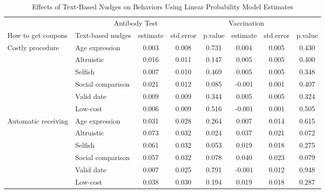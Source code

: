 \documentclass[
  11pt,
  a4paper,
]{article}
\begin{document}
\begin{table}

\caption{\label{tab:act-reg-ftest}Effects of Text-Based Nudges on Behaviors Using Linear Probability Model Estimates}
\centering
\begin{tabular}[t]{>{\raggedright\arraybackslash}p{5em}lcccccc}
\toprule
\multicolumn{2}{c}{ } & \multicolumn{3}{c}{Antibody Test} & \multicolumn{3}{c}{Vaccination} \\
\cmidrule(l{3pt}r{3pt}){3-5} \cmidrule(l{3pt}r{3pt}){6-8}
How to get coupons & Text-based nudges & estimate & std.error & p.value & estimate  & std.error  & p.value \\
\midrule
Costly procedure & Age expression & 0.003 & 0.008 & 0.731 & 0.004 & 0.005 & 0.430\\
 & Altruistic & 0.016 & 0.011 & 0.147 & 0.005 & 0.005 & 0.400\\
 & Selfish & 0.007 & 0.010 & 0.469 & 0.005 & 0.005 & 0.348\\
 & Social comparison & 0.021 & 0.012 & 0.085 & -0.001 & 0.001 & 0.407\\
 & Valid date & 0.009 & 0.009 & 0.344 & 0.005 & 0.005 & 0.324\\
 & Low-cost & 0.006 & 0.009 & 0.516 & -0.001 & 0.001 & 0.505\\
Automatic receiving & Age expression & 0.031 & 0.028 & 0.264 & 0.007 & 0.014 & 0.615\\
 & Altruistic & 0.073 & 0.032 & 0.024 & 0.037 & 0.021 & 0.072\\
 & Selfish & 0.061 & 0.032 & 0.053 & 0.019 & 0.018 & 0.275\\
 & Social comparison & 0.057 & 0.032 & 0.078 & 0.040 & 0.023 & 0.079\\
 & Valid date & 0.007 & 0.025 & 0.791 & -0.001 & 0.012 & 0.948\\
 & Low-cost & 0.038 & 0.030 & 0.194 & 0.019 & 0.018 & 0.287\\
\bottomrule
\end{tabular}
\end{table}
\end{document}
